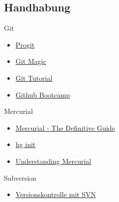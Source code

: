 \documentclass[presentation]{beamer}
\begin{document}
\subsection{Handhabung}
\begin{frame}{Git}
  \begin{itemize}
  \item<1-> \href{http://progit.org/book/}{Progit}
  \item<2-> \href{http://www-cs-students.stanford.edu/~blynn/gitmagic/}{Git Magic}
  \item<3-> \href{http://www.kernel.org/pub/software/scm/git/docs/gittutorial.html}{Git Tutorial} 
  \item<4-> \href{http://help.github.com/}{Github Bootcamp}
  \end{itemize}
\end{frame}
\begin{frame}{Mercurial}
  \begin{itemize}
  \item<1-> \href{http://hgbook.red-bean.com/}{Mercurial - The Definitive Guide}
  \item<2-> \href{http://hginit.com/}{hg init}
  \item<3-> \href{http://mercurial.selenic.com/wiki/UnderstandingMercurial}{Understanding Mercurial}
  \end{itemize}
\end{frame}
\begin{frame}{Subversion}
  \begin{itemize}
  \item<1-> \href{http://svnbook.red-bean.com/}{Versionskontrolle mit SVN}
  \end{itemize}
\end{frame}
\end{document}
